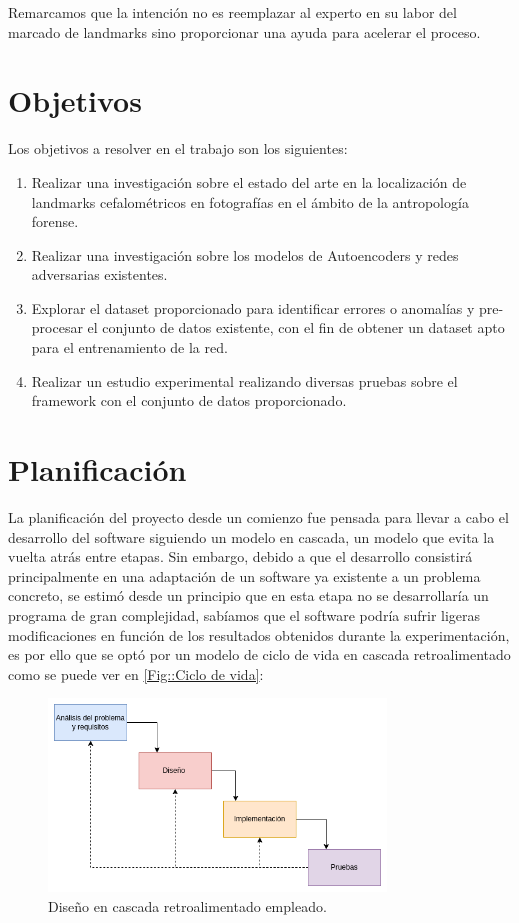 \noindent Remarcamos que la intención no es reemplazar al experto en su labor del marcado de landmarks sino proporcionar una ayuda para acelerar el proceso.

\section{Objetivos}

\noindent Los objetivos a resolver en el trabajo son los siguientes: 

\begin{enumerate}
    \item Realizar una investigación sobre el estado del arte en la localización de landmarks cefalométricos en fotografías en el ámbito de la antropología forense.
    \item Realizar una investigación sobre los modelos de Autoencoders y redes adversarias existentes.
    \item Explorar el dataset proporcionado para identificar errores o anomalías y pre-procesar el conjunto de datos existente, con el fin de obtener un dataset apto para el entrenamiento de la red.
    \item Realizar un estudio experimental realizando diversas pruebas sobre el framework con el conjunto de datos proporcionado.
\end{enumerate}

\section{Planificación}
    \noindent La planificación del proyecto desde un comienzo fue pensada para llevar a cabo el desarrollo del software siguiendo un modelo en cascada, un modelo que evita la vuelta atrás entre etapas. Sin embargo, debido a que el desarrollo consistirá principalmente en una adaptación de un software ya existente a un problema concreto, se estimó desde un principio que en esta etapa no se desarrollaría un programa de gran complejidad, sabíamos que el software podría sufrir ligeras modificaciones en función de los resultados obtenidos durante la experimentación, es por ello que se optó por un modelo de ciclo de vida en cascada retroalimentado como se puede ver en \autoref{Fig::Ciclo de vida}:


    \begin{figure}[!h]
        \centering
        \includegraphics[width=0.8\textwidth]{img/disenio_cascada.png}
        \caption{Diseño en cascada retroalimentado empleado.}
        \label{Fig::Ciclo de vida}
    \end{figure}

